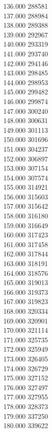 { 136.000	288581 \\
 137.000	288984 \\
 138.000	289388 \\
 139.000	292967 \\
 140.000	293319 \\
 141.000	293740 \\
 142.000	294146 \\
 143.000	298485 \\
 144.000	298953 \\
 145.000	299482 \\
 146.000	299874 \\
 147.000	300240 \\
 148.000	300631 \\
 149.000	301113 \\
 150.000	301696 \\
 151.000	304237 \\
 152.000	306897 \\
 153.000	307154 \\
 154.000	307574 \\
 155.000	314921 \\
 156.000	315603 \\
 157.000	315642 \\
 158.000	316180 \\
 159.000	316649 \\
 160.000	317423 \\
 161.000	317458 \\
 162.000	317844 \\
 163.000	318191 \\
 164.000	318576 \\
 165.000	319013 \\
 166.000	319373 \\
 167.000	319823 \\
 168.000	320334 \\
 169.000	320901 \\
 170.000	321114 \\
 171.000	325735 \\
 172.000	325949 \\
 173.000	326405 \\
 174.000	326729 \\
 175.000	327152 \\
 176.000	327497 \\
 177.000	327955 \\
 178.000	328373 \\
 179.000	337250 \\
 180.000	339622 \\
}
